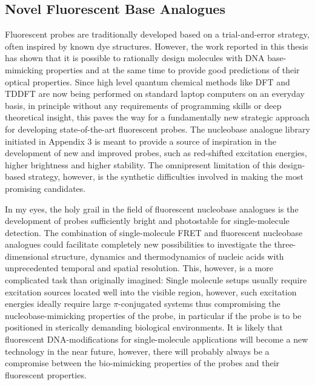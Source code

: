 \subsection{Novel Fluorescent Base Analogues}
 Fluorescent probes are traditionally developed based on a trial-and-error strategy, often inspired by known dye structures. However, the work reported in this thesis has shown that it is possible to rationally design molecules with DNA base-mimicking properties and at the same time to provide good predictions of their optical properties. Since high level quantum chemical methods like DFT and TDDFT are now being performed on standard laptop computers on an everyday basis, in principle without any requirements of programming skills or deep theoretical insight, this paves the way for a fundamentally new strategic approach for developing state-of-the-art fluorescent probes. The nucleobase analogue library initiated in Appendix 3 is meant to provide a source of inspiration in the development of new and improved probes, such as red-shifted excitation energies, higher brightness and higher stability. The omnipresent limitation of this design-based strategy, however, is the synthetic difficulties involved in making the most promising candidates.

 In my eyes, the holy grail in the field of fluorescent nucleobase analogues is the development of probes sufficiently bright and photostable for single-molecule detection. The combination of single-molecule FRET and fluorescent nucleobase analogues could facilitate completely new possibilities to investigate the three-dimensional structure, dynamics and thermodynamics of nucleic acids with unprecedented temporal and spatial resolution. This, however, is a more complicated task than originally imagined: Single molecule setups usually require excitation sources located well into the visible region, however, such excitation energies ideally require large $\pi$-conjugated systems thus compromising the nucleobase-mimicking properties of the probe, in particular if the probe is to be positioned in sterically demanding biological environments. It is likely that fluorescent DNA-modifications for single-molecule applications will become a new technology in the near future, however, there will probably always be a compromise between the bio-mimicking properties of the probes and their fluorescent properties.

